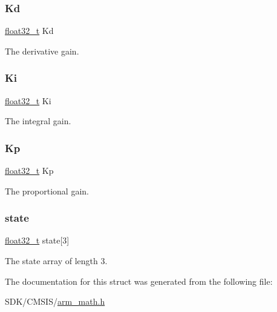 \subsubsection{\texorpdfstring{Kd}{Kd}}
{\footnotesize\ttfamily \mbox{\hyperlink{arm__math_8h_a4611b605e45ab401f02cab15c5e38715}{float32\+\_\+t}} Kd}

The derivative gain. \mbox{\label{structarm__pid__instance__f32_ad1a1aa1c10a2dca201a3422f82198777}} 
\subsubsection{\texorpdfstring{Ki}{Ki}}
{\footnotesize\ttfamily \mbox{\hyperlink{arm__math_8h_a4611b605e45ab401f02cab15c5e38715}{float32\+\_\+t}} Ki}

The integral gain. \mbox{\label{structarm__pid__instance__f32_abe23f3e122ef5f55398fcf77c793c425}} 
\subsubsection{\texorpdfstring{Kp}{Kp}}
{\footnotesize\ttfamily \mbox{\hyperlink{arm__math_8h_a4611b605e45ab401f02cab15c5e38715}{float32\+\_\+t}} Kp}

The proportional gain. \mbox{\label{structarm__pid__instance__f32_a473556ac6100fc188e77930d56f51062}} 
\subsubsection{\texorpdfstring{state}{state}}
{\footnotesize\ttfamily \mbox{\hyperlink{arm__math_8h_a4611b605e45ab401f02cab15c5e38715}{float32\+\_\+t}} state\mbox{[}3\mbox{]}}

The state array of length 3. 

The documentation for this struct was generated from the following file\+:\begin{DoxyCompactItemize}
\item 
S\+D\+K/\+C\+M\+S\+I\+S/\mbox{\hyperlink{arm__math_8h}{arm\+\_\+math.\+h}}\end{DoxyCompactItemize}
